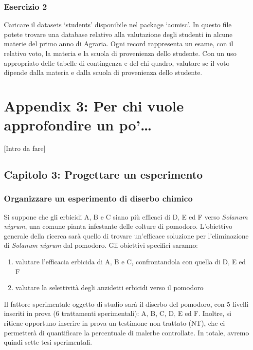 \documentclass[a4paper,12pt,oneside]{book}
\providecommand{\tightlist}{%
  \setlength{\itemsep}{0pt}\setlength{\parskip}{0pt}}
\theoremstyle{definition}
\theoremstyle{definition}
\theoremstyle{definition}
\theoremstyle{remark}
\begin{document}
\subsection*{Esercizio 2}\label{esercizio-2-1}

Caricare il datasets `students' disponibile nel package `aomisc'. In
questo file potete trovare una database relativo alla valutazione degli
studenti in alcune materie del primo anno di Agraria. Ogni record
rappresenta un esame, con il relativo voto, la materia e la scuola di
provenienza dello studente. Con un uso appropriato delle tabelle di
contingenza e del chi quadro, valutare se il voto dipende dalla materia
e dalla scuola di provenienza dello studente.

\chapter{Appendix 3: Per chi vuole approfondire un
po'\ldots{}}\label{appendix-3-per-chi-vuole-approfondire-un-po}

{[}Intro da fare{]}

\section{Capitolo 3: Progettare un
esperimento}\label{capitolo-3-progettare-un-esperimento}

\subsection{Organizzare un esperimento di diserbo
chimico}\label{organizzare-un-esperimento-di-diserbo-chimico}

Si suppone che gli erbicidi A, B e C siano più efficaci di D, E ed F
verso \emph{Solanum nigrum}, una comune pianta infestante delle colture
di pomodoro. L'obiettivo generale della ricerca sarà quello di trovare
un'efficace soluzione per l'eliminazione di \emph{Solanum nigrum} dal
pomodoro. Gli obiettivi specifici saranno:

\begin{enumerate}
\def\labelenumi{\arabic{enumi}.}
\tightlist
\item
  valutare l'efficacia erbicida di A, B e C, confrontandola con quella
  di D, E ed F
\item
  valutare la selettività degli anzidetti erbicidi verso il pomodoro
\end{enumerate}

Il fattore sperimentale oggetto di studio sarà il diserbo del pomodoro,
con 5 livelli inseriti in prova (6 trattamenti sperimentali): A, B, C,
D, E ed F. Inoltre, si ritiene opportuno inserire in prova un testimone
non trattato (NT), che ci permetterà di quantificare la percentuale di
malerbe controllate. In totale, avremo quindi sette tesi sperimentali.
\end{document}
